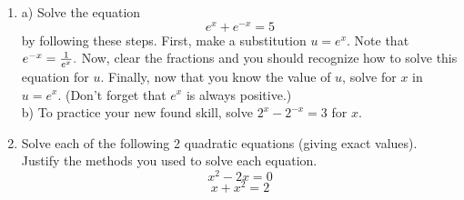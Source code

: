 \section{}
\begin{enumerate}


\item a)  Solve the equation $$e^x  + e^{ - x}  = 5$$ by following these steps.  First, make a substitution $u = e^x .$  Note that $e^{ - x}  = {1 \over {e^x }}.$  Now, clear the fractions and you should recognize how to solve this equation for $u$.  Finally, now that you know the value of $u$, solve for $x$ in $u = e^x .$  (Don't forget that $e^x$ is always positive.) \\  b)  To practice your new found skill, solve $2^x  - 2^{ - x}  = 3$ for $x$.

\item Solve each of the following 2 quadratic equations (giving exact values).  Justify the methods you used to solve each equation.  $$x^2 - 2x = 0$$ $$x + x^2 = 2$$


\end{enumerate}
